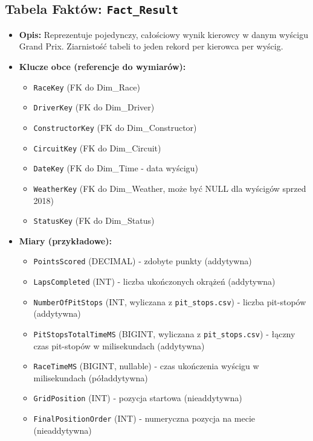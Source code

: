 \documentclass[a4paper,12pt]{article}
\begin{document}
\subsection{Tabela Faktów: \texttt{Fact\_Result}}
\begin{itemize}[label=\textbullet, leftmargin=*]
  \item \textbf{Opis:} Reprezentuje pojedynczy, całościowy wynik kierowcy w danym wyścigu Grand Prix. Ziarnistość tabeli to jeden rekord per kierowca per wyścig.
  \item \textbf{Klucze obce (referencje do wymiarów):}
        \begin{itemize}[label=\textendash, leftmargin=1em]
          \item \texttt{RaceKey} (FK do Dim\_Race)
          \item \texttt{DriverKey} (FK do Dim\_Driver)
          \item \texttt{ConstructorKey} (FK do Dim\_Constructor)
          \item \texttt{CircuitKey} (FK do Dim\_Circuit)
          \item \texttt{DateKey} (FK do Dim\_Time - data wyścigu)
          \item \texttt{WeatherKey} (FK do Dim\_Weather, może być NULL dla wyścigów sprzed 2018)
          \item \texttt{StatusKey} (FK do Dim\_Status)
        \end{itemize}
  \item \textbf{Miary (przykładowe):}
        \begin{itemize}[label=\textendash, leftmargin=1em]
          \item \texttt{PointsScored} (DECIMAL) - zdobyte punkty (addytywna)
          \item \texttt{LapsCompleted} (INT) - liczba ukończonych okrążeń (addytywna)
          \item \texttt{NumberOfPitStops} (INT, wyliczana z \texttt{pit\_stops.csv}) - liczba pit-stopów (addytywna)
          \item \texttt{PitStopsTotalTimeMS} (BIGINT, wyliczana z \texttt{pit\_stops.csv}) - łączny czas pit-stopów w milisekundach (addytywna)
          \item \texttt{RaceTimeMS} (BIGINT, nullable) - czas ukończenia wyścigu w milisekundach (póładdytywna)
          \item \texttt{GridPosition} (INT) - pozycja startowa (nieaddytywna)
          \item \texttt{FinalPositionOrder} (INT) - numeryczna pozycja na mecie (nieaddytywna)

\end{itemize}
\end{itemize}
\end{document}
